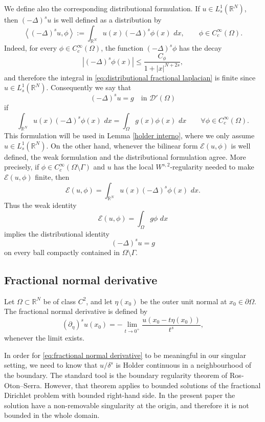 \documentclass[11pt,a4paper]{article}
\newcommand{\R}{\mathbb R}
\newcommand{\dd}{\,d}
\begin{document}
We define also the corresponding distributional formulation. If
\(u\in L^1_s(\mathbb R^N)\), then \((-\Delta)^s u\) is well defined as a
distribution by
\begin{equation}\label{eq:distributional fractional laplacian}
\left\langle (-\Delta)^s u,\phi\right\rangle
:=
\int_{\mathbb R^N} u(x)(-\Delta)^s\phi(x)\,\dd x,
\qquad
\phi\in C_c^\infty(\Omega).
\end{equation}
Indeed, for every \(\phi\in C_c^\infty(\Omega)\), the function
\((-\Delta)^s\phi\) has the decay
\[
|(-\Delta)^s\phi(x)|
\le
\frac{C_\phi}{1+|x|^{N+2s}},
\]
and therefore the integral in
\eqref{eq:distributional fractional laplacian} is finite since
\(u\in L^1_s(\mathbb R^N)\).
Consequently we say that
\[
(-\Delta)^s u=g
\quad\text{in }\mathcal D'(\Omega)
\]
if
\begin{equation}\label{eq:distributional definition}
\int_{\mathbb R^N} u(x)(-\Delta)^s\phi(x)\,\dd x
=
\int_\Omega g(x)\phi(x)\,\dd x
\qquad
\forall \phi\in C_c^\infty(\Omega).
\end{equation}
This formulation will be used in Lemma \ref{holder interno},
where we only assume \(u\in L^1_s(\mathbb R^N)\). On the other hand, whenever
the bilinear form \(\mathcal E(u,\phi)\) is well defined, the weak formulation
and the distributional formulation agree. More precisely, if
\(\phi\in C_c^\infty(\Omega\setminus\Gamma)\) and \(u\) has the local
\(W^{s,2}\)-regularity needed to make \(\mathcal E(u,\phi)\) finite, then
\[
\mathcal E(u,\phi)
=
\int_{\mathbb R^N}u(x)(-\Delta)^s\phi(x)\,\dd x.
\]
Thus the weak identity
\[
\mathcal E(u,\phi)=\int_\Omega g\phi\,\dd x
\]
implies the distributional identity
\[
(-\Delta)^s u=g
\]
on every ball compactly contained in \(\Omega\setminus\Gamma\).

\subsection{Fractional normal derivative}

Let \(\Omega\subset\R^N\) be of class \(C^2\), and let \(\eta(x_0)\) be the
outer unit normal at \(x_0\in\partial\Omega\). The fractional normal derivative
is defined by
\begin{equation}\label{eq:fractional normal derivative}
(\partial_\eta)^s u(x_0)
=
-\lim_{t\to0^+}\frac{u(x_0-t\eta(x_0))}{t^s},
\end{equation}
whenever the limit exists.

In order for \eqref{eq:fractional normal derivative} to be meaningful in
our singular setting, we need to know that \(u/\delta^s\) is Holder
continuous in a neighbourhood of the boundary. The standard tool is the
boundary regularity theorem of Ros-Oton--Serra. However, that theorem
applies to bounded solutions of the fractional Dirichlet problem with bounded
right-hand side. In the present paper the solution have a non-removable
singularity at the origin, and therefore it is not bounded in the whole domain.
\end{document}
